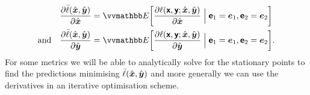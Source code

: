 \begin{equation}
\begin{split}
  \pd{\bar{\ell}(\hat{\vct{x}},\hat{\vct{y}})}{\hat{\vct{x}}} &=
  \expc{
    \pd{\ell(\rvct{x},\rvct{y};\hat{\vct{x}},\hat{\vct{y}})}{\hat{\vct{x}}}
    \mathrel{\Big|} \rvct{e}_1 =\vct{e}_1, \rvct{e}_2=\vct{e}_2}\\
  \textrm{and}\quad
  \pd{\bar{\ell}(\hat{\vct{x}},\hat{\vct{y}})}{\hat{\vct{y}}} &=
  \expc{
    \pd{\ell(\rvct{x},\rvct{y};\hat{\vct{x}},\hat{\vct{y}})}{\hat{\vct{y}}}
    \mathrel{\Big|} \rvct{e}_1 =\vct{e}_1, \rvct{e}_2=\vct{e}_2}.
\end{split}
\end{equation}
For some metrics we will be able to analytically solve for the stationary points to find the predictions minimising $\bar{\ell}(\hat{\boldsymbol{x}},\hat{\boldsymbol{y}})$ and more generally we can use the derivatives in an iterative optimisation scheme.

